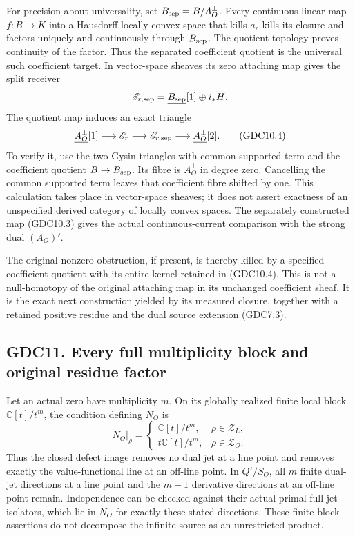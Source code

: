 For precision about universality, set \(B_{\rm sep}=B/A_O^\perp\). Every
continuous linear map \(f:B\to K\) into a Hausdorff locally convex space
that kills \(a_r\) kills its closure and factors uniquely and
continuously through \(B_{\rm sep}\). The quotient topology proves
continuity of the factor. Thus the separated coefficient quotient is the
universal such coefficient target. In vector-space sheaves its zero
attaching map gives the split receiver \[
\mathscr E_{r,\rm sep}=\underline{B_{\rm sep}}[1]\oplus i_*\overline H.
\] The quotient map induces an exact triangle \[
\underline{A_O^\perp}[1]\longrightarrow\mathscr E_r
\longrightarrow\mathscr E_{r,\rm sep}
\longrightarrow\underline{A_O^\perp}[2].
\tag{GDC10.4}
\] To verify it, use the two Gysin triangles with common supported term
and the coefficient quotient \(B\to B_{\rm sep}\). Its fibre is
\(A_O^\perp\) in degree zero. Cancelling the common supported term
leaves that coefficient fibre shifted by one. This calculation takes
place in vector-space sheaves; it does not assert exactness of an
unspecified derived category of locally convex spaces. The separately
constructed map (GDC10.3) gives the actual continuous-current comparison
with the strong dual \((A_O)'\).

The original nonzero obstruction, if present, is thereby killed by a
specified coefficient quotient with its entire kernel retained in
(GDC10.4). This is not a null-homotopy of the original attaching map in
its unchanged coefficient sheaf. It is the exact next construction
yielded by its measured closure, together with a retained positive
residue and the dual source extension (GDC7.3).

\subsection{GDC11. Every full multiplicity block and original residue
factor}\label{gdc11.-every-full-multiplicity-block-and-original-residue-factor}

Let an actual zero have multiplicity \(m\). On its globally realized
finite local block \(\mathbb C[t]/t^m\), the condition defining \(N_O\)
is \[
N_O|_\rho=
\begin{cases}
\mathbb C[t]/t^m,&\rho\in\mathscr Z_L,\\
t\mathbb C[t]/t^m,&\rho\in\mathscr Z_O.
\end{cases}
\tag{GDC11.1}
\] Thus the closed defect image removes no dual jet at a line point and
removes exactly the value-functional line at an off-line point. In
\(Q'/S_O\), all \(m\) finite dual-jet directions at a line point and the
\(m-1\) derivative directions at an off-line point remain. Independence
can be checked against their actual primal full-jet isolators, which lie
in \(N_O\) for exactly these stated directions. These finite-block
assertions do not decompose the infinite source as an unrestricted
product.

